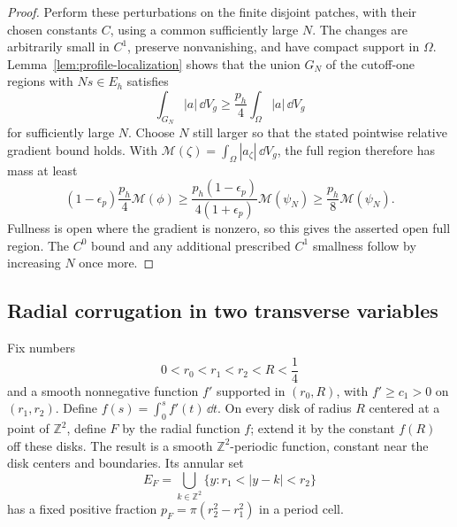 \begin{proof}
Perform these perturbations on the finite disjoint patches, with their
chosen constants $C$, using a common sufficiently large $N$.  The changes
are arbitrarily small in $C^1$, preserve nonvanishing, and have compact
support in $\Omega$.  Lemma~\ref{lem:profile-localization} shows that the
union $G_N$ of the cutoff-one regions with $Ns\in E_h$ satisfies
\[
 \int_{G_N}|a|\,\dd V_g
 \ge\frac{p_h}{4}\int_\Omega|a|\,\dd V_g
\]
for sufficiently large $N$.  Choose $N$ still larger so that the stated
pointwise relative gradient bound holds.  With
$\mathcal M(\zeta)=\int_\Omega|a_\zeta|\,\dd V_g$, the full region
therefore has mass at least
\[
 (1-\epsilon_p)\frac{p_h}{4}\mathcal M(\phi)
 \ge\frac{p_h(1-\epsilon_p)}{4(1+\epsilon_p)}\mathcal M(\psi_N)
 \ge\frac{p_h}{8}\mathcal M(\psi_N).
\]
Fullness is open where the gradient is nonzero, so this gives the asserted
open full region.  The $C^0$ bound and any additional prescribed $C^1$
smallness follow by increasing $N$ once more.
\end{proof}

\subsection{Radial corrugation in two transverse variables}

Fix numbers
\[
 0<r_0<r_1<r_2<R<\frac14
\]
and a smooth nonnegative function $f'$ supported in $(r_0,R)$, with
$f'\ge c_1>0$ on $(r_1,r_2)$.  Define
$f(s)=\int_0^s f'(t)\,\dd t$.  On every disk of radius $R$ centered at
a point of $\mathbb Z^2$, define $F$ by the radial function $f$; extend it
by the constant $f(R)$ off these disks.  The result is a smooth
$\mathbb Z^2$-periodic function, constant near the disk centers and
boundaries.  Its annular set
\[
 E_F=\bigcup_{k\in\mathbb Z^2}
       \{y:r_1<|y-k|<r_2\}
\]
has a fixed positive fraction $p_F=\pi(r_2^2-r_1^2)$ in a period cell.

